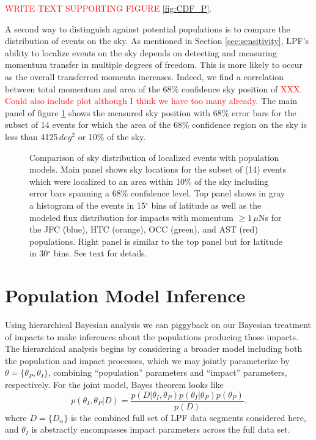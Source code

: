 \documentclass[twocolumn, trackchanges]{aastex62}
\newcommand{\red}[1]{\textcolor{red}{#1}}
\begin{document}
\red{WRITE TEXT SUPPORTING FIGURE \ref{fig:CDF_P}.}

A second way to distinguish against potential populations is to compare the distribution of events on the sky.  As mentioned in Section \ref{sec:sensitivity}, LPF's ability to localize events on the sky depends on detecting and measuring momentum transfer in multiple degrees of freedom. This is more likely to occur as the overall transferred momenta increases. Indeed, we find a correlation between total momentum and area of the 68\% confidence sky position of \red{XXX. Could also include plot although I think we have too many already}. The main panel of figure \ref{fig:mapCompare} shows the measured sky position with 68\% error bars for the subset of 14 events for which the area of the 68\% confidence region on the sky is less than 4125$\,deg^2$ or 10\% of the sky. 


\begin{figure}[h!]
\vspace*{-8mm}
\caption{Comparison of sky distribution of localized events with population models. Main panel shows sky locations for the subset of (14) events which were localized to an area within 10\% of the sky including error bars spanning a 68\% confidence level. Top panel shows in gray a histogram of the events in 15$^\circ$ bins of latitude as well as the modeled flux distribution for impacts with momentum $\geq 1\,\mu$Ns for the JFC (blue), HTC (orange), OCC (green), and AST (red) populations. Right panel is similar to the top panel but for latitude in 30$^\circ$ bins. See text for details. \label{fig:mapCompare}}
\end{figure}

\section{Population Model Inference} \label{sec:model_inference}

Using hierarchical Bayesian analysis we can piggyback on our Bayesian treatment of impacts to make inferences about the populations producing those impacts. The hierarchical analysis begins by considering a broader model including both the population and impact processes, which we may jointly parameterize by $\theta=\{\theta_P,\theta_I\}$, combining ``population'' parameters and ``impact'' parameters, respectively.  For the joint model, Bayes theorem looks like
\begin{equation}
  p(\theta_I,\theta_P|D)=\frac{p(D|\theta_I,\theta_P)p(\theta_I|\theta_P)p(\theta_P)}{p(D)}.
\end{equation}
where $D=\{D_\alpha\}$ is the combined full set of LPF data segments considered here, and $\theta_I$ is abstractly encompasses impact parameters across the full data set.
\end{document}
